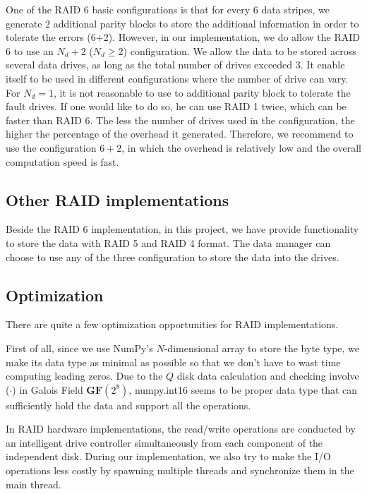 One of the RAID 6 basic configurations is that for every 6 data stripes, we generate 2 additional parity blocks to store the additional information in order to tolerate the errors (6+2). However, in our implementation, we do allow the RAID 6 to use an $N_d+2$ ($N_d \geq 2$) configuration. We allow the data to be stored across several data drives, as long as the total number of drives exceeded 3. It enable itself to be used in different configurations where the number of drive can vary. For $N_d = 1$, it is not reasonable to use to additional parity block to tolerate the fault drives. If one would like to do so, he can use RAID 1 twice, which can be faster than RAID 6. The less the number of drives used in the configuration, the higher the percentage of the overhead it generated. Therefore, we recommend to use the configuration $6 + 2$, in which the overhead is relatively low and the overall computation speed is fast.

\subsection{Other RAID implementations}

Beside the RAID 6 implementation, in this project, we have provide functionality to store the data with RAID 5 and RAID 4 format. The data manager can choose to use any of the three configuration to store the data into the drives.

\subsection{Optimization}

There are quite a few optimization opportunities for RAID implementations.

First of all, since we use NumPy's $N$-dimensional array to store the byte type, we make its data type as minimal as possible so that we don't have to wast time computing leading zeros. Due to the $Q$ disk data calculation and checking involve ($\cdot$) in Galois Field $\mathbf{GF}(2^8)$, \textsf{numpy.int16} seems to be proper data type that can sufficiently hold the data and support all the operations.

In RAID hardware implementations, the read/write operations are conducted by an intelligent drive controller simultaneously from each component of the independent disk. During our implementation, we also try to make the I/O operations less costly by spawning multiple threads and synchronize them in the main thread.

